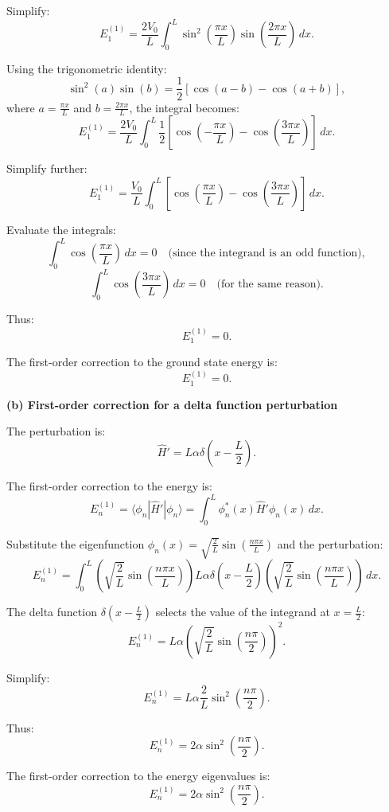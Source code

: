 Simplify:
\[
E_1^{(1)} = \frac{2 V_0}{L} \int_0^L \sin^2\left(\frac{\pi x}{L}\right) \sin\left(\frac{2\pi x}{L}\right) \, dx.
\]

Using the trigonometric identity:
\[
\sin^2(a) \sin(b) = \frac{1}{2} \left[\cos(a-b) - \cos(a+b)\right],
\]
where \(a = \frac{\pi x}{L}\) and \(b = \frac{2\pi x}{L}\), the integral becomes:
\[
E_1^{(1)} = \frac{2 V_0}{L} \int_0^L \frac{1}{2} \left[\cos\left(-\frac{\pi x}{L}\right) - \cos\left(\frac{3\pi x}{L}\right)\right] \, dx.
\]

Simplify further:
\[
E_1^{(1)} = \frac{V_0}{L} \int_0^L \left[\cos\left(\frac{\pi x}{L}\right) - \cos\left(\frac{3\pi x}{L}\right)\right] \, dx.
\]

Evaluate the integrals:
\[
\int_0^L \cos\left(\frac{\pi x}{L}\right) \, dx = 0 \quad \text{(since the integrand is an odd function)},
\]
\[
\int_0^L \cos\left(\frac{3\pi x}{L}\right) \, dx = 0 \quad \text{(for the same reason)}.
\]

Thus:
\[
E_1^{(1)} = 0.
\]

The first-order correction to the ground state energy is:
\[
E_1^{(1)} = 0.
\]

\textbf{(b) First-order correction for a delta function perturbation}

The perturbation is:
\[
\hat{H}' = L \alpha \delta\left(x - \frac{L}{2}\right).
\]

The first-order correction to the energy is:
\[
E_n^{(1)} = \langle \phi_n | \hat{H}' | \phi_n \rangle = \int_0^L \phi_n^*(x) \hat{H}' \phi_n(x) \, dx.
\]

Substitute the eigenfunction \(\phi_n(x) = \sqrt{\frac{2}{L}} \sin\left(\frac{n \pi x}{L}\right)\) and the perturbation:
\[
E_n^{(1)} = \int_0^L \left(\sqrt{\frac{2}{L}} \sin\left(\frac{n \pi x}{L}\right)\right) L \alpha \delta\left(x - \frac{L}{2}\right) \left(\sqrt{\frac{2}{L}} \sin\left(\frac{n \pi x}{L}\right)\right) \, dx.
\]

The delta function \(\delta\left(x - \frac{L}{2}\right)\) selects the value of the integrand at \(x = \frac{L}{2}\):
\[
E_n^{(1)} = L \alpha \left(\sqrt{\frac{2}{L}} \sin\left(\frac{n \pi}{2}\right)\right)^2.
\]

Simplify:
\[
E_n^{(1)} = L \alpha \frac{2}{L} \sin^2\left(\frac{n \pi}{2}\right).
\]

Thus:
\[
E_n^{(1)} = 2 \alpha \sin^2\left(\frac{n \pi}{2}\right).
\]

The first-order correction to the energy eigenvalues is:
\[
E_n^{(1)} = 2 \alpha \sin^2\left(\frac{n \pi}{2}\right).
\]

